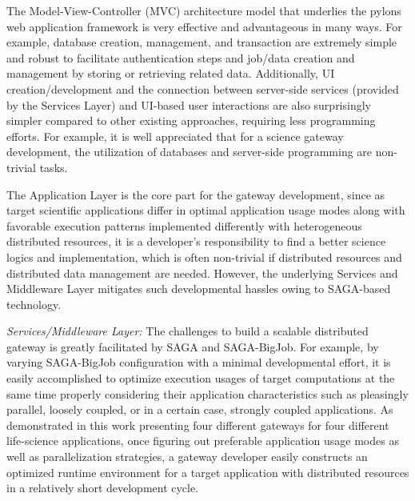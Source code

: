 \documentclass{sig-alternate}
\begin{document}
The Model-View-Controller (MVC) architecture model that underlies the
pylons web application framework is very effective and advantageous in
many ways. For example, database creation, management, and transaction
are extremely simple and robust to facilitate authentication steps and
job/data creation and management by storing or retrieving related
data.  Additionally, UI creation/development and the connection
between server-side services (provided by the Services Layer) and
UI-based user interactions are also surprisingly simpler compared to
other existing approaches, requiring less programming efforts.  For
example, it is well appreciated that for a science gateway
development, the utilization of databases and server-side programming
are non-trivial tasks.

The Application Layer is the core part for the gateway development,
since as target scientific applications differ in optimal application
usage modes along with favorable execution patterns implemented
differently with heterogeneous distributed resources, it is a
developer's responsibility to find a better science logics and
implementation, which is often non-trivial if distributed resources
and distributed data management are needed.  However, the underlying
Services and Middleware Layer mitigates such developmental hassles
owing to SAGA-based technology.

\textit{Services/Middleware Layer:} The challenges to build a scalable
distributed gateway is greatly facilitated by SAGA and SAGA-BigJob.
For example, by varying SAGA-BigJob configuration with a minimal
developmental effort, it is easily accomplished to optimize execution
usages of target computations at the same time properly considering
their application characteristics such as pleasingly parallel, loosely
coupled, or in a certain case, strongly coupled applications.  As
demonstrated in this work presenting four different gateways for four
different life-science applications, once figuring out preferable
application usage modes as well as parallelization strategies, a
gateway developer easily constructs an optimized runtime environment
for a target application with distributed resources in a relatively
short development cycle.

\end{document}
